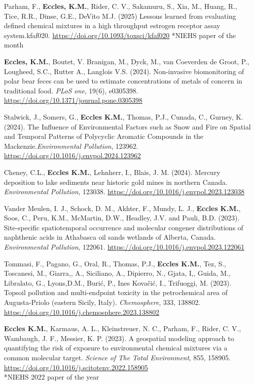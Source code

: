 \documentclass[margin,line]{res}
\begin{document}
\begin{resume}
Parham, F., \textbf{Eccles, K.M.}, Rider, C. V., Sakamuru, S., Xia, M., Huang, R., Tice, R.R., Dinse, G.E., DeVito M.J. (2025) Lessons learned from evaluating defined chemical mixtures in a high throughput estrogen receptor assay system.kfaf020. \url{https://doi.org/10.1093/toxsci/kfaf020}
\mbox{*}NIEHS paper of the month

\textbf{Eccles, K.M.}, Boutet, V. Branigan, M., Dyck, M., van Coeverden de Groot, P., Lougheed, S.C., Rutter A., Langlois V.S. (2024). Non-invasive biomonitoring of polar bear feces can be used to estimate concentrations of metals of concern in traditional food. \textit{PLoS one}, 19(6), e0305398. \url{https://doi.org/10.1371/journal.pone.0305398}

Stalwick, J., Somers, G., \textbf{Eccles K.M.}, Thomas, P.J., Cunada, C., Gurney, K. (2024). The Influence of Environmental Factors such as Snow and Fire on Spatial and Temporal Patterns of Polycyclic Aromatic Compounds in the Mackenzie.\textit{Environmental Pollution}, 123962. \url{https://doi.org/10.1016/j.envpol.2024.123962}

Cheney, C.L., \textbf{Eccles K.M.}, Lehnherr, I., Blais, J. M. (2024). Mercury deposition to lake sediments near historic gold mines in northern Canada. \textit{Environmental Pollution}, 123038. \url{https://doi.org/10.1016/j.envpol.2023.123038}

Vander Meulen, I. J., Schock, D. M., Akhter, F., Mundy, L. J., \textbf{Eccles K.M.}, Soos, C., Peru, K.M., McMartin, D.W., Headley, J.V. and Pauli, B.D. (2023). Site-specific spatiotemporal occurrence and molecular congener distributions of naphthenic acids in Athabasca oil sands wetlands of Alberta, Canada. \textit{Environmental Pollution}, 122061. \url{https://doi.org/10.1016/j.envpol.2023.122061}

Tommasi, F., Pagano, G., Oral, R., Thomas, P.J., \textbf{Eccles K.M.}, Tez, S., Toscanesi, M., Giarra,, A., Siciliano, A., Dipierro, N., Gjata, I,, Guida, M., Libralato, G., Lyons,D.M., Burić, P., Ines Kovačić, I.,  Trifuoggi, M. (2023). Topsoil pollution and multi-endpoint toxicity in the petrochemical area of Augusta-Priolo (eastern Sicily, Italy). \textit{Chemosphere}, 333, 138802. \url{https://doi.org/10.1016/j.chemosphere.2023.138802}

\textbf{Eccles K.M.}, Karmaus, A. L., Kleinstreuer, N. C., Parham, F., Rider, C. V., Wambaugh, J. F., Messier, K. P. (2023). A geospatial modeling approach to quantifying the risk of exposure to environmental chemical mixtures via a common molecular target. \textit{Science of The Total Environment}, 855, 158905. \url{https://doi.org/10.1016/j.scitotenv.2022.158905}\\
\mbox{*}NIEHS 2022 paper of the year


\end{resume}
\end{document}
